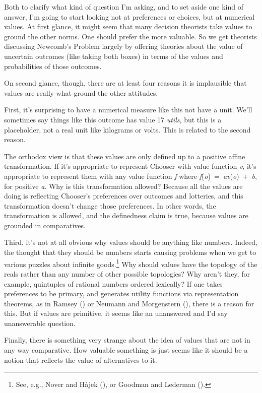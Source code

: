 \documentclass[
  11pt,
  letterpaper,
  DIV=11,
  numbers=noendperiod,
  twoside]{scrartcl}
\begin{document}
Both to clarify what kind of question I'm asking, and to set aside one
kind of answer, I'm going to start looking not at preferences or
choices, but at numerical values. At first glance, it might seem that
many decision theorists take values to ground the other norms. One
should prefer the more valuable. So we get theorists discussing
Newcomb's Problem largely by offering theories about the value of
uncertain outcomes (like taking both boxes) in terms of the values and
probabilities of those outcomes.

On second glance, though, there are at least four reasons it is
implausible that values are really what ground the other attitudes.

First, it's surprising to have a numerical measure like this not have a
unit. We'll sometimes say things like this outcome has value 17
\emph{utils}, but this is a placeholder, not a real unit like kilograms
or volts. This is related to the second reason.

The orthodox view is that these values are only defined up to a positive
affine transformation. If it's appropriate to represent Chooser with
value function \emph{v}, it's appropriate to represent them with any
value function \emph{f} where
\emph{f}(\emph{o})~=~\emph{av}(\emph{o})~+~\emph{b}, for positive
\emph{a}. Why is this transformation allowed? Because all the values are
doing is reflecting Chooser's preferences over outcomes and lotteries,
and this transformation doesn't change those preferences. In other
words, the transformation is allowed, and the definedness claim is true,
because values are grounded in comparatives.

Third, it's not at all obvious why values should be anything like
numbers. Indeed, the thought that they should be numbers starts causing
problems when we get to various puzzles about infinite goods.\footnote{See,
  e.g., Nover and Hàjek (), or Goodman and
  Lederman ().} Why should
values have the topology of the reals rather than any number of other
possible topologies? Why aren't they, for example, quintuples of
rational numbers ordered lexically? If one takes preferences to be
primary, and generates utility functions via representation theorems, as
in Ramsey () or Neumann and
Morgenstern (), there is a reason for this.
But if values are primitive, it seems like an unanswered and I'd say
unanswerable question.

Finally, there is something very strange about the idea of values that
are not in any way comparative. How valuable something is just seems
like it should be a notion that reflects the value of alternatives to
it.
\end{document}
